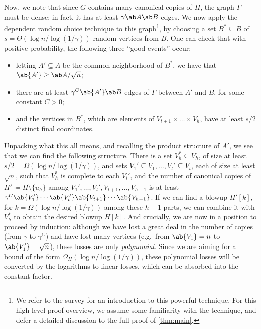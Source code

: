 Now, we note that since $G$ contains many canonical copies of $H$, the graph $\Gamma$ must be dense; in fact, it has at least $\gamma \ab A \ab B$ edges. We now apply the dependent random choice technique to this graph\footnote{We refer to the survey \cite{MR2768884} for an introduction to this powerful technique. For this high-level proof overview, we assume some familiarity with the technique, and defer a detailed discussion to the full proof of \cref{thm:main}.}, by choosing a set $B^*\subseteq B$ of $s = \Theta(\log n/{\log (1/\gamma)})$ random vertices from $B$. One can check that with positive probability, the following three ``good events'' occur:
\begin{itemize}
    \item letting $A'\subseteq A$ be the common neighborhood of $B^*$, we have that $\ab{A'} \geq \ab A/{\sqrt n}$;
    \item there are at least $\gamma^C \ab{A'} \ab B$ edges of $\Gamma$ between $A'$ and $B$, for some constant $C>0$;
    \item and the vertices in $B^*$, which are elements of $V_{t+1}\times \dots \times V_h$, have at least $s/2$ distinct final coordinates.
\end{itemize}
Unpacking what this all means, and recalling the product structure of $A'$, we see that we can find the following structure. There is a set $V_h^* \subseteq V_h$, of size at least $s/2 = \Omega(\log n/{\log(1/\gamma)})$, and sets $V_1' \subseteq V_1,\dots,V_t' \subseteq V_t$, each of size at least $\sqrt n$, such that $V_h^*$ is complete to each $V_i'$, and the number of canonical copies of $H' \coloneqq H\setminus \{u_h\}$ among $V_1',\dots,V_t',V_{t+1},\dots,V_{h-1}$ is at least $\gamma^C \ab{V_1'}\dotsb \ab{V_t'}\ab{V_{t+1}}\dotsb\ab{V_{h-1}}$. If we can find a blowup $H'[k]$, for $k = \Omega(\log n/{\log(1/\gamma)})$ among these $h-1$ parts, we can combine it with $V_h^*$ to obtain the desired blowup $H[k]$. And crucially, we are now in a position to proceed by induction: although we have lost a great deal in the number of copies (from $\gamma$ to $\gamma^C$) and have lost many vertices (e.g.\ from $\ab{V_1}=n$ to $\ab{V_1'}=\sqrt n$), these losses are only \emph{polynomial}. Since we are aiming for a bound of the form $\Omega_H(\log n/{\log(1/\gamma)})$, these polynomial losses will be converted by the logarithms to linear losses, which can be absorbed into the constant factor. 

